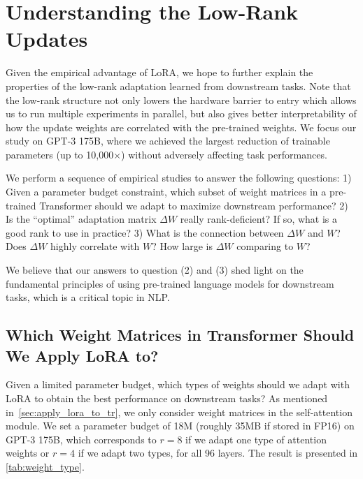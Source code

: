 \documentclass{article} %
\begin{document}
\section{Understanding the Low-Rank Updates}
\label{sec:science}

Given the empirical advantage of LoRA, we hope to further explain the properties of the low-rank adaptation learned from downstream tasks.
Note that the low-rank structure not only lowers the hardware barrier to entry which allows us to run multiple experiments in parallel, but also gives better interpretability of how the update weights are correlated with the pre-trained weights.
We focus our study on GPT-3 175B, where we achieved the largest reduction of trainable parameters (up to 10,000$\times$) without adversely affecting task performances.

We perform a sequence of empirical studies to answer the following questions:
1) Given a parameter budget constraint, which subset of weight matrices in a pre-trained Transformer should we adapt to maximize downstream performance?
2) Is the ``optimal'' adaptation matrix $\Delta W$ really rank-deficient? If so, what is a good rank to use in practice?
3) What is the connection between $\Delta W$ and $W$? Does $\Delta W$ highly correlate with $W$? How large is $\Delta W$ comparing to $W$?

We believe that our answers to question (2) and (3) shed light on the fundamental principles of using pre-trained language models for downstream tasks, which is a critical topic in NLP.

\subsection{Which Weight Matrices in Transformer Should We Apply LoRA to?}
\label{sec:weight_types}
Given a limited parameter budget, which types of weights should we adapt with LoRA to obtain the best performance on downstream tasks?
As mentioned in~\autoref{sec:apply_lora_to_tr}, we only consider weight matrices in the self-attention module.
We set a parameter budget of 18M (roughly 35MB if stored in FP16) on GPT-3 175B, which corresponds to $r=8$ if we adapt one type of attention weights or $r=4$ if we adapt two types, for all 96 layers.
The result is presented in \autoref{tab:weight_type}.
\end{document}
